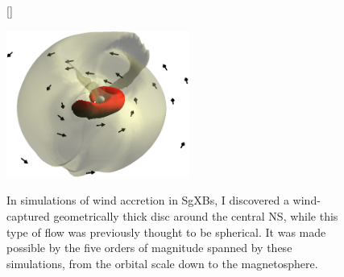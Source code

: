 \documentclass[11pt,onecolumn]{article}
\makeatletter
\newcommand{\sgxs}{SgXBs\xspace}
\newcommand*{\ns}{NS\@\xspace}
\makeatother
\begin{document}



\vspace*{-0.3cm}
\begin{figure}[!h]
[\FBwidth]
{\caption{In simulations of wind accretion in \sgxs, I discovered a wind-captured geometrically thick disc around the central \ns, while this type of flow was previously thought to be spherical. It was made possible by the five orders of magnitude spanned by these simulations, from the orbital scale down to the magnetosphere.}\label{fig:disc}}
{\includegraphics[width=6cm]{Figures/disc.png}}
\vspace*{-0.4cm}
\end{figure}
\end{document}
